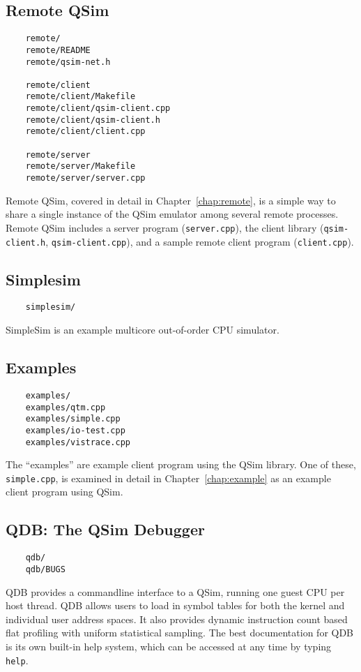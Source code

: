 \documentclass[letterpaper, 10pt]{book}
\begin{document}
\subsection{Remote QSim}
\begin{verbatim}
    remote/
    remote/README
    remote/qsim-net.h

    remote/client
    remote/client/Makefile
    remote/client/qsim-client.cpp
    remote/client/qsim-client.h
    remote/client/client.cpp

    remote/server
    remote/server/Makefile
    remote/server/server.cpp
\end{verbatim}

Remote QSim, covered in detail in Chapter~\ref{chap:remote}, is a simple way to
share a single instance of the QSim emulator among several remote processes.
Remote QSim includes a server program (\texttt{server.cpp}), the client library
(\texttt{qsim-client.h}, \texttt{qsim-client.cpp}), and a sample remote client
program (\texttt{client.cpp}).

\subsection{Simplesim}
\begin{verbatim}
    simplesim/
\end{verbatim}
SimpleSim is an example multicore out-of-order CPU simulator.

\subsection{Examples}
\begin{verbatim}
    examples/
    examples/qtm.cpp
    examples/simple.cpp
    examples/io-test.cpp
    examples/vistrace.cpp
\end{verbatim}
The ``examples'' are example client program using the QSim library. One of
these, \texttt{simple.cpp}, is examined in detail in Chapter~\ref{chap:example} 
as an example client program using QSim.

\subsection{QDB: The QSim Debugger}
\begin{verbatim}
    qdb/
    qdb/BUGS
\end{verbatim}
QDB provides a commandline interface to a QSim, running one guest CPU per host
thread. QDB allows users to load in symbol tables for both the kernel and
individual user address spaces. It also provides dynamic instruction count
based flat profiling with uniform statistical sampling. The best documentation
for QDB is its own built-in help system, which can be accessed at any time by
typing \texttt{help}.
\end{document}
